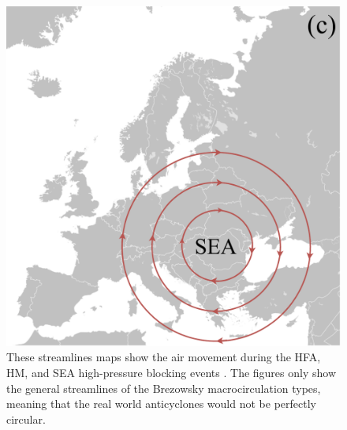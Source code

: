 \begin{figure}[H]
\begin{minipage}{0.32\textwidth}
    \end{minipage}
    \hfill
    \begin{minipage}{0.32\textwidth}
        \includegraphics[width=\linewidth]{Figures/SEA.pdf}
    \end{minipage}
    \caption{These streamlines maps show the air movement during the HFA, HM, and SEA high-pressure blocking events \cite{siglermarianBlankMapEurope2007}. The figures only show the general streamlines of the Brezowsky macrocirculation types, meaning that the real world anticyclones would not be perfectly circular.}
    \label{fig:map}
\end{figure}
